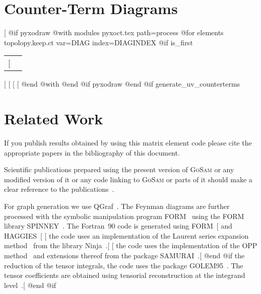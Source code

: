{{{{{{{\section{Counter-Term Diagrams}
[%
@if pyxodraw %
@with modules pyxoct.tex path=process %
   @for elements topolopy.keep.ct var=DIAG index=DIAGINDEX %
     @if is_first %
\begin{longtable}{cc}
\endfirsthead
\endhead
[%
\hbox{
\begin{minipage}{0.45\textwidth}
\begin{center}
[%
{\sl Diagram~[%
\end{center}
\end{minipage}}
[%
\end{longtable}
[%
[%
[%
[%
   @end @with%
@end @if pyxodraw %
@end @if generate_uv_counterterms %
\printindex

\section{Related Work}
If you publish results obtained by using this matrix element code
please cite the appropriate papers in the bibliography of this document.

Scientific publications prepared using the present version of
\textsc{GoSam} or any modified version of it or any code linking to
\textsc{GoSam} or parts of it should make a clear
reference to the publications~\cite{Cullen:2014yla,Cullen:2011ac}.

For graph generation we use QGraf~\cite{Nogueira:1991ex}.
The Feynman diagrams are further processed with the symbolic manipulation
program FORM~\cite{Kuipers:2012rf,Vermaseren:2000nd} using the FORM library
SPINNEY~\cite{Cullen:2010jv}.
The Fortran~90 code is generated using 
FORM~\cite{Kuipers:2012rf,Vermaseren:2000nd}[%
and HAGGIES~\cite{Reiter:2009ts}[%
[%
the code uses an implementation of the Laurent series expansion 
method~\cite{Mastrolia:2012bu}
from the library Ninja~\cite{Peraro:2014cba}.[%
[%
the code uses the implementation of the OPP
method~\cite{Ossola:2006us,Ossola:2007bb}
and extensions thereof from the package
SAMURAI~\cite{Mastrolia:2010nb}.[%
@end @if %
the reduction of the tensor integrals, the code uses the 
package GOLEM95~\cite{Guillet:2013msa,Binoth:2008uq,Cullen:2011kv}.
The tensor coefficients are
obtained using tensorial reconstruction at the integrand
level~\cite{Heinrich:2010ax}.[%
@end @if %

}}}}}}}
